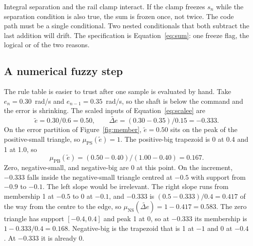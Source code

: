Integral separation and the rail clamp interact. If the clamp freezes $s_n$ while the separation condition is also true, the sum is frozen once, not twice. The code path must be a single conditional. Two nested conditionals that both subtract the last addition will drift. The specification is Equation~\eqref{eq:sum}: one freeze flag, the logical or of the two reasons.

\subsection{A numerical fuzzy step}

The rule table is easier to trust after one sample is evaluated by hand. Take $e_n=0.30$~rad/s and $e_{n-1}=0.35$~rad/s, so the shaft is below the command and the error is shrinking. The scaled inputs of Equation~\eqref{eq:scalee} are
\begin{equation}
\tilde e = 0.30/0.6 = 0.50, \qquad \widetilde{\Delta e} = (0.30-0.35)/0.15 = -0.333.
\end{equation}
On the error partition of Figure~\ref{fig:member}, $\tilde e=0.50$ sits on the peak of the positive-small triangle, so $\mu_{\mathrm{PS}}(\tilde e)=1$. The positive-big trapezoid is 0 at 0.4 and 1 at 1.0, so
\begin{equation}
\mu_{\mathrm{PB}}(\tilde e) = (0.50-0.40)/(1.00-0.40) = 0.167.
\end{equation}
Zero, negative-small, and negative-big are 0 at this point. On the increment, $-0.333$ falls inside the negative-small triangle centred at $-0.5$ with support from $-0.9$ to $-0.1$. The left slope would be irrelevant. The right slope runs from membership 1 at $-0.5$ to 0 at $-0.1$, and $-0.333$ is $(0.5-0.333)/0.4=0.417$ of the way from the centre to the edge, so $\mu_{\mathrm{NS}}(\widetilde{\Delta e})=1-0.417=0.583$. The zero triangle has support $[-0.4,0.4]$ and peak 1 at 0, so at $-0.333$ its membership is $1-0.333/0.4=0.168$. Negative-big is the trapezoid that is 1 at $-1$ and 0 at $-0.4$. At $-0.333$ it is already 0.

